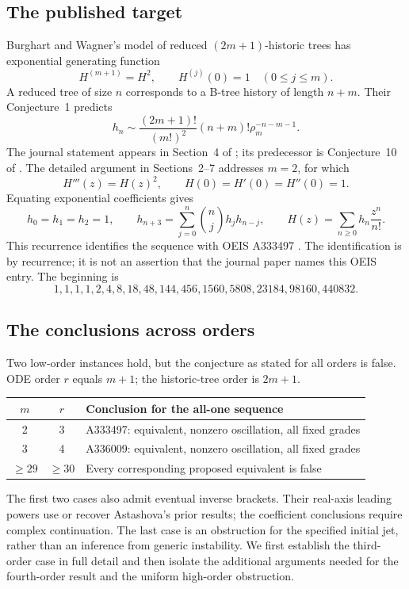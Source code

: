 \documentclass[11pt]{article}
\theoremstyle{remark}\newtheorem{remark}[theorem]{Remark}
\numberwithin{equation}{section}
\begin{document}
\subsection{The published target}
Burghart and Wagner's model of reduced $(2m+1)$-historic trees has exponential generating function
\begin{equation}\label{his:eq:family}
 H^{(m+1)}=H^2,\qquad H^{(j)}(0)=1\quad(0\le j\le m).
\end{equation}
A reduced tree of size $n$ corresponds to a B-tree history of length $n+m$. Their Conjecture~1 predicts
\begin{equation}\label{his:eq:conjecture}
 h_n\sim\frac{(2m+1)!}{(m!)^2}(n+m)!\rho_m^{-n-m-1}.
\end{equation}
The journal statement appears in Section~4 of \cite{bw2026}; its predecessor is Conjecture~10 of \cite{bw2024}. The detailed argument in Sections~2--7 addresses $m=2$, for which
\begin{equation}\label{his:eq:ivp}
 H'''(z)=H(z)^2,\qquad H(0)=H'(0)=H''(0)=1.
\end{equation}
Equating exponential coefficients gives
\begin{equation}\label{his:eq:recurrence}
 h_0=h_1=h_2=1,\qquad
 h_{n+3}=\sum_{j=0}^n\binom njh_jh_{n-j},\qquad
 H(z)=\sum_{n\ge0}h_n\frac{z^n}{n!}.
\end{equation}
This recurrence identifies the sequence with OEIS A333497 \cite{oeis}. The identification is by recurrence; it is not an assertion that the journal paper names this OEIS entry. The beginning is
\[
1,1,1,1,2,4,8,18,48,144,456,1560,5808,23184,98160,440832.
\]

\subsection{The conclusions across orders}
Two low-order instances hold, but the conjecture as stated for all orders is false. ODE order $r$ equals $m+1$; the historic-tree order is $2m+1$.
\begin{center}
\begin{tabular}{c c l}
\toprule
$m$ & $r$ & Conclusion for the all-one sequence\\
\midrule
2 & 3 & A333497: equivalent, nonzero oscillation, all fixed grades\\
3 & 4 & A336009: equivalent, nonzero oscillation, all fixed grades\\
$\ge29$ & $\ge30$ & Every corresponding proposed equivalent is false\\
\bottomrule
\end{tabular}
\end{center}
The first two cases also admit eventual inverse brackets. Their real-axis leading powers use or recover Astashova's prior results; the coefficient conclusions require complex continuation. The last case is an obstruction for the specified initial jet, rather than an inference from generic instability. We first establish the third-order case in full detail and then isolate the additional arguments needed for the fourth-order result and the uniform high-order obstruction.
\end{document}
